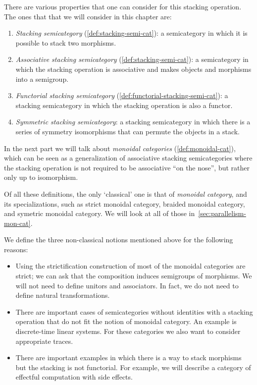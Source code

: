 There are various properties that one can consider for this stacking operation.
The ones that that we will consider in this chapter are:
%
\begin{enumerate}
    \item \emph{Stacking semicategory} (\cref{def:stacking-semi-cat}): a semicategory in which  it is possible to stack two morphisms.
    \item \emph{Associative stacking semicategory} (\cref{def:stacking-semi-cat}): a semicategory in which the stacking operation is associative and makes objects and morphisms into a semigroup. 
    \item \emph{Functorial stacking semicategory} (\cref{def:functorial-stacking-semi-cat}): a stacking semicategory in which the stacking operation is also a functor.
    \item \emph{Symmetric stacking semicategory}: a stacking semicategory in which there is a series of symmetry isomorphisms that can permute the objects in a stack.
\end{enumerate}
%
In the next part we will talk about \emph{monoidal categories} (\cref{def:monoidal-cat}), which can be seen as a generalization of associative stacking semicategories where the stacking operation is not required to be associative ``on the nose'', but rather only up to isomorphism.

\begin{remark}
    Of all these definitions, the only `classical' one is that of \emph{monoidal category}, and its specializations, such as strict monoidal category, braided monoidal category, and symetric monoidal category.
    We will look at all of those in~\cref{sec:parallelism-mon-cat}.

    We define the three non-classical notions mentioned above for the following reasons:
    \begin{itemize}
        \item Using the strictification construction of \SetL most of the monoidal categories are strict; we can ask that the composition induces semigroups of morphisms.
              We will not need to define unitors and associators.
              In fact, we do not need to define natural transformations. 
        \item There are important cases of semicategories without identities with a stacking operation that do not fit the notion of monoidal category.
              An example is discrete-time linear systems.
              For these categories we also want to consider appropriate traces.
        \item There are important examples in which there is a way to stack morphisms but the stacking is not functorial.
              For example, we will describe a category of effectful computation with side effects.
    \end{itemize}
\end{remark}

